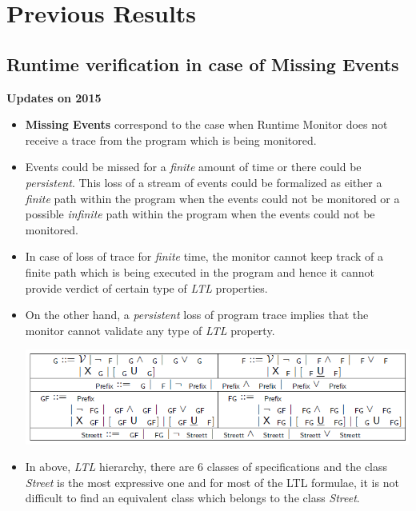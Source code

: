 \documentclass[]{article}
\begin{document}
\section{Previous Results}

		\subsection{Runtime verification in case of Missing Events}
		\textbf{Updates on  {2015}}\newline
		\begin{itemize}
			
			\item \textbf{Missing Events} correspond to the case when Runtime Monitor does not receive a trace from the program which is being monitored.
			
			\item Events could be missed for a \emph{finite} amount of time or there could be \emph{persistent}. This loss of a stream of events could be formalized as either a \emph{finite} path within the program when the events could not be monitored or a possible \emph{infinite} path within the program when the events could not be monitored.
			
			\item In case of loss of trace for \emph{finite} time, the monitor cannot keep track of a finite path which is being executed in the program and hence it cannot provide verdict of certain type of \emph{LTL} properties.
			
			\item On the other hand, a \emph{persistent} loss of program trace implies that the monitor cannot validate any type of \emph{LTL} property.
			
			\includegraphics[scale=0.4]{LTLHierarchy.png}
			
			\item In above, \emph{LTL} hierarchy, there are 6 classes of specifications and the class \emph{Street} is the most expressive one and for most of the LTL formulae, it is not difficult to find an equivalent class which belongs to the class \emph{Street}.
			

\end{itemize}
\end{document}
